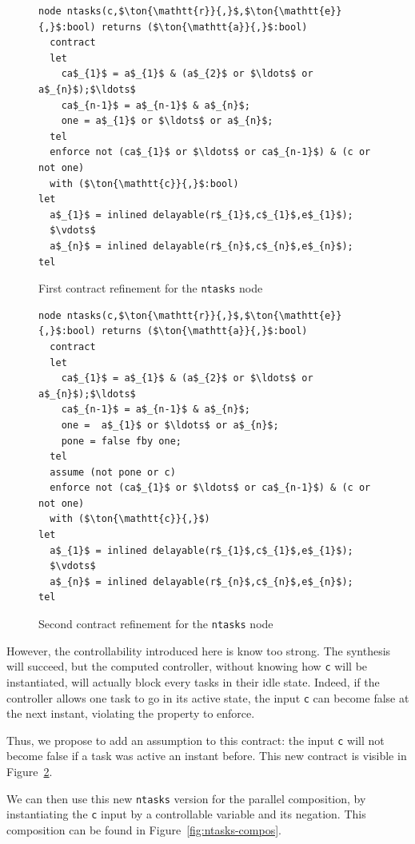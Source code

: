 \documentclass[a4paper]{article}
\begin{document}
\begin{figure}[htb]
\begin{lstlisting}
node ntasks(c,$\ton{\mathtt{r}}{,}$,$\ton{\mathtt{e}}{,}$:bool) returns ($\ton{\mathtt{a}}{,}$:bool)
  contract
  let
    ca$_{1}$ = a$_{1}$ & (a$_{2}$ or $\ldots$ or a$_{n}$);$\ldots$
    ca$_{n-1}$ = a$_{n-1}$ & a$_{n}$;
    one = a$_{1}$ or $\ldots$ or a$_{n}$;
  tel
  enforce not (ca$_{1}$ or $\ldots$ or ca$_{n-1}$) & (c or not one)
  with ($\ton{\mathtt{c}}{,}$:bool)
let
  a$_{1}$ = inlined delayable(r$_{1}$,c$_{1}$,e$_{1}$); 
  $\vdots$
  a$_{n}$ = inlined delayable(r$_{n}$,c$_{n}$,e$_{n}$); 
tel
\end{lstlisting}
\caption{First contract refinement for the \texttt{ntasks} node}
\label{fig:n-del-task-2}
\end{figure}

\begin{figure}[htb]
  \centering
\begin{lstlisting}
node ntasks(c,$\ton{\mathtt{r}}{,}$,$\ton{\mathtt{e}}{,}$:bool) returns ($\ton{\mathtt{a}}{,}$:bool)
  contract
  let
    ca$_{1}$ = a$_{1}$ & (a$_{2}$ or $\ldots$ or a$_{n}$);$\ldots$
    ca$_{n-1}$ = a$_{n-1}$ & a$_{n}$;
    one =  a$_{1}$ or $\ldots$ or a$_{n}$;
    pone = false fby one;
  tel
  assume (not pone or c)
  enforce not (ca$_{1}$ or $\ldots$ or ca$_{n-1}$) & (c or not one)
  with ($\ton{\mathtt{c}}{,}$)
let
  a$_{1}$ = inlined delayable(r$_{1}$,c$_{1}$,e$_{1}$); 
  $\vdots$
  a$_{n}$ = inlined delayable(r$_{n}$,c$_{n}$,e$_{n}$); 
tel
\end{lstlisting}
  \caption{Second contract refinement for the \texttt{ntasks} node}
  \label{fig:n-del-tasks-3}
\end{figure}

However, the controllability introduced here is know too strong. The synthesis
will succeed, but the computed controller, without knowing how \texttt{c} will
be instantiated, will actually block every tasks in their idle state. Indeed, if
the controller allows one task to go in its active state, the input \texttt{c}
can become false at the next instant, violating the property to enforce.

Thus, we propose to add an assumption to this contract: the input \texttt{c}
will not become false if a task was active an instant before. This new contract
is visible in Figure~\ref{fig:n-del-tasks-3}.

We can then use this new \texttt{ntasks} version for the parallel composition,
by instantiating the \texttt{c} input by a controllable variable and its
negation. This composition can be found in Figure~\ref{fig:ntasks-compos}.
\end{document}

